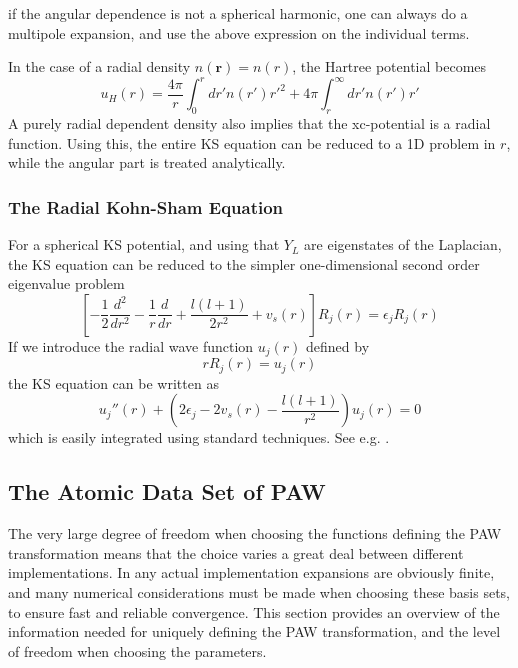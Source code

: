\documentclass[a4paper]{article}
\newcommand{\br}{\mathbf{r}}
\begin{document}
%
if the angular dependence is not a spherical harmonic, one can always
do a multipole expansion, and use the above expression on the
individual terms.
\par In the case of a radial density $n(\br) = n(r)$, the Hartree
potential becomes
%
\begin{equation}
  u_H(r) = \frac{4\pi}{r}\int_0^r dr' n(r')r'^2 + 4\pi\int_r^\infty dr' n(r')r'
\end{equation}
%
A purely radial dependent density also implies that the xc-potential
is a radial function. Using this, the entire KS equation can be
reduced to a 1D problem in $r$, while the angular part is treated
analytically.

\subsubsection{The Radial Kohn-Sham Equation}
For a spherical KS potential, and using that $Y_L$ are eigenstates of
the Laplacian, the KS equation can be reduced to the simpler
one-dimensional second order eigenvalue problem
%
\begin{equation}\label{eq: radial KS equation}
  \left[ -\frac{1}{2}\frac{d^2}{dr^2} - \frac{1}{r}\frac{d}{dr} + \frac{l(l+1)}{2r^2} + v_s(r)\right]R_j(r) = \epsilon_j R_j(r)
\end{equation}
%
If we introduce the radial wave function $u_j(r)$ defined by
%
\begin{equation}
  r R_j(r) = u_j(r)
\end{equation}
%
the KS equation can be written as
%
\begin{equation}
  u_j''(r)  + \left(2\epsilon_j - 2v_s(r)- \frac{l(l+1)}{r^2}\right) u_j(r) = 0
\end{equation}
%
which is easily integrated using standard techniques. See e.g. \cite[chapter 6]{Fiolhais2003}.

\subsection{The Atomic Data Set of PAW}\label{sec: partial wave basis}
The very large degree of freedom when choosing the functions defining
the PAW transformation means that the choice varies a great deal
between different implementations. In any actual implementation
expansions are obviously finite, and many numerical considerations
must be made when choosing these basis sets, to ensure fast and
reliable convergence. This section provides an overview of the
information needed for uniquely defining the PAW transformation, and
the level of freedom when choosing the parameters.
\end{document}

